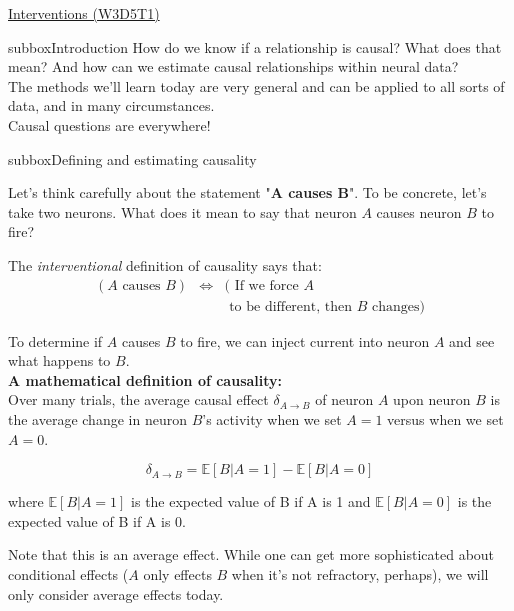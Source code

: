 \begin{textbox}{\href{https://compneuro.neuromatch.io/tutorials/W3D5_NetworkCausality/student/W3D5_Tutorial1.html}{Interventions (W3D5T1)}   }
\begin{subbox}{subbox}{Introduction}
\scriptsize
How do we know if a relationship is causal? What does that mean? And how can we estimate causal relationships within neural data?\\

The methods we'll learn today are very general and can be applied to all sorts of data, and in many circumstances.\\
Causal questions are everywhere!

\end{subbox}
\begin{subbox}{subbox}{Defining and estimating causality}
\scriptsize

Let's think carefully about the statement "\textbf{A causes B}". To be concrete, let's take two neurons. What does it mean to say that neuron $A$ causes neuron $B$ to fire?

The \textit{interventional} definition of causality says that:
\begin{eqnarray*}
(A \text{ causes } B) &\Leftrightarrow& ( \text{ If we force }A \\
& & \text { to be different, then }B\text{ changes})
\end{eqnarray*}

To determine if $A$ causes $B$ to fire, we can inject current into neuron $A$ and see what happens to $B$.\\

\textbf{A mathematical definition of causality:}\\
Over many trials, the average causal effect $\delta_{A\to B}$ of neuron $A$ upon neuron $B$ is the average change in neuron $B$'s activity when we set $A=1$ versus when we set $A=0$.


\begin{equation*}
\delta_{A\to B} = \mathbb{E}[B | A=1] -  \mathbb{E}[B | A=0] 
\end{equation*}


where $\mathbb{E}[B | A=1]$ is the expected value of B if A is 1 and  $\mathbb{E}[B | A=0]$ is the expected value of B if A is 0.

Note that this is an average effect. While one can get more sophisticated about conditional effects ($A$ only effects $B$ when it's not refractory, perhaps), we will only consider average effects today.



\end{subbox}
\end{textbox}
